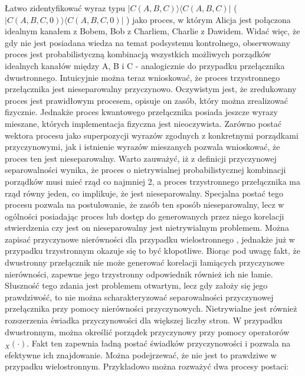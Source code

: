 \documentclass[10pt]{article} %
\newcommand{\Ket}[1]{|#1\rangle}
\newcommand{\Bra}[1]{\langle#1|}
\begin{document}
Łatwo zidentyfikować wyraz typu $\Ket{C(A,B,C)}\Bra{C(A,B,C)}$ ( $\Ket{C(A,B,C,0)}\Bra{C(A,B,C,0)}$ ) jako proces, w którym Alicja jest połączona idealnym kanałem z Bobem, Bob z Charliem, Charlie z Dawidem. Widać więc, że gdy nie jest posiadana wiedza na temat podsystemu kontrolnego, obserwowany proces jest probabilistyczną kombinacją wszystkich możliwych porządków idealnych kanałów między A, B i C - analogicznie do przypadku przełącznika dwustronnego. Intuicyjnie można teraz wnioskować, że proces trzystronnego przełącznika jest nieseparowalny przyczynowo. Oczywistym jest, że zredukowany proces jest prawidłowym procesem, opisuje on zasób, który można zrealizować fizycznie. Jednakże proces kwantowego przełącznika posiada jeszcze wyrazy mieszane, których implementacja fizyczna jest nieoczywista. Zarówno postać wektora procesu jako superpozycji wyrazów zgodnych z konkretnymi porządkami przyczynowymi, jak i istnienie wyrazów mieszanych pozwala wnioskować, że proces ten jest nieseparowalny. Warto zauważyć, iż z definicji przyczynowej separowalności wynika, że proces o nietrywialnej probabilistycznej kombinacji porządków musi mieć rząd co najmniej 2, a proces trzystronnego przełącznika ma rząd równy jeden, co implikuje, że jest nieseparowalny. Specjalna postać tego procesu pozwala na postulowanie, że zasób ten sposób nieseparowalny, lecz w ogólności posiadając proces lub dostęp do generowanych przez niego korelacji stwierdzenia czy jest on nieseparowalny jest nietrywialnym problemem. Można zapisać przyczynowe nierówności dla przypadku wielostronnego \cite{mp_ci}, jednakże już w przypadku trzystronnym okazuje się to być kłopotliwe.
Biorąc pod uwagę fakt, że dwustronny przełącznik nie może generować korelacji łamiących przyczynowe nierówności, zapewne jego trzystronny odpowiednik również ich nie łamie. Słuszność tego zdania jest problemem otwartym, lecz gdy założy się jego prawdziwość, to nie można scharakteryzować separowalności przyczynowej przełącznika przy pomocy nierówności przyczynowych. Nietrywialne jest również rozszerzenia świadka przyczynowości dla większej liczby stron. W przypadku dwustronnym, można określić porządek przyczynowy przy pomocy operatorów ${}_X(\cdot)$. Fakt ten zapewnia ładną postać świadków przyczynowości i pozwala na efektywne ich znajdowanie. Można podejrzewać, że nie jest to prawdziwe w przypadku wielostronnym. Przykładowo można rozważyć dwa procesy postaci:
\end{document}
